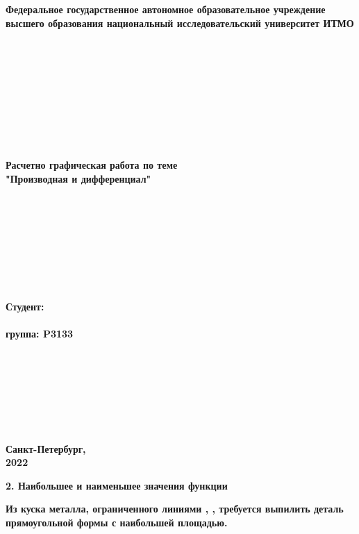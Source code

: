 \documentclass{article}
\begin{document}
\begin{center}
\textbf{\Large{Федеральное государственное автономное образовательное учреждение высшего образования национальный исследовательский 
университет ИТМО}}
\end{center} \textbf{\\ \\}
\textbf{\\ \\ \\ \\ \\ \\}

\begin{center}
\LARGE\textbf{
Расчетно графическая работа по теме \\
"Производная и дифференциал"
}
\end{center}
\textbf{\\ \\ \\ \\ \\ \\ \\}

\begin{flushright}
\LARGE\textbf{Студент:}\\
\LARGE{}\\
\LARGE\textbf{группа: P3133}\\
\end{flushright}
\textbf{\\ \\ \\ \\ \\ \\}

\begin{center}
    \Large\textbf{Санкт-Петербург,} \\
    \Large\textbf{2022}
\end{center}
\newpage
\setcounter{page}{1}
\pagestyle{plain}

\centering

\LARGE\textbf{2. Наибольшее и наименьшее значения функции}
\linebreak

\large\textbf{
Из куска металла, ограниченного линиями , , требуется
выпилить деталь прямоугольной формы с наибольшей площадью.
}
\linebreak
\end{document}
